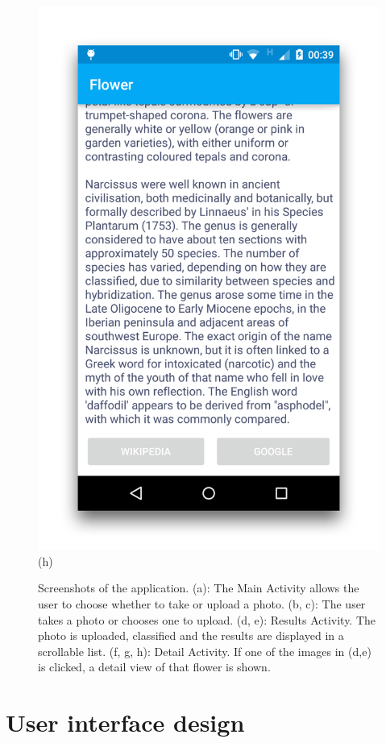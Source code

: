 \documentclass[11pt, a4paper]{report}
\begin{document}
\begin{figure}[h]
\begin{minipage}[b]{0.2\linewidth}
	\includegraphics[totalheight=6cm]{img/46.png}
	(h)
\end{minipage}

\caption{Screenshots of the application. (a): The Main Activity allows the user to choose whether to take or upload a photo. (b, c): The user takes a photo or chooses one to upload. (d, e): Results Activity. The photo is uploaded, classified and the results are displayed in a scrollable list. (f, g, h): Detail Activity. If one of the images in (d,e) is clicked, a detail view of that flower is shown.}
\label{img:39}
\end{figure}




\section{User interface design}
\end{document}
